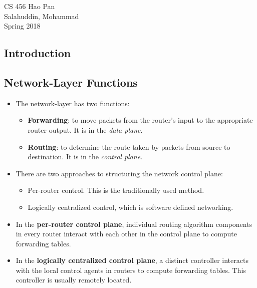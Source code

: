 \documentclass{article}
\begin{document}
\noindent
{CS 456 \hfill Hao Pan}\\
{Salahuddin, Mohammad}\\
{Spring 2018}


\begin{center}
\section{Introduction}
\noindent
\end{center}

\subsection{Network-Layer Functions}

\begin{itemize}
\item The network-layer has two functions:
\begin{itemize}
\item {\bf Forwarding}: to move packets from the router's input to the appropriate router output. It is in the \emph{data plane}.
\item {\bf Routing}: to determine the route taken by packets from source to destination. It is in the \emph{control plane}.
\end{itemize}
\item There are two approaches to structuring the network control plane:
\begin{itemize}
\item Per-router control. This is the traditionally used method.
\item Logically centralized control, which is software defined networking.
\end{itemize}
\item In the {\bf per-router control plane}, individual routing algorithm components in every router interact with each other in the control plane to compute forwarding tables.
\item In the {\bf logically centralized control plane}, a distinct controller interacts with the local control agents in routers to compute forwarding tables. This controller is usually remotely located.
\end{itemize}
\end{document}
